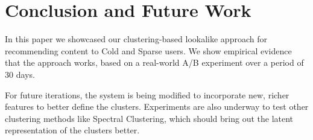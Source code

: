 \section{Conclusion and Future Work}

In this paper we showcased our clustering-based lookalike approach for recommending content to Cold and Sparse users. We show empirical evidence that the approach works, based on a real-world A/B experiment over a period of 30 days. 

For future iterations, the system is being modified to incorporate new, richer features to better define the clusters. Experiments are also underway to test other clustering methods like Spectral Clustering, which should bring out the latent representation of the clusters better. 